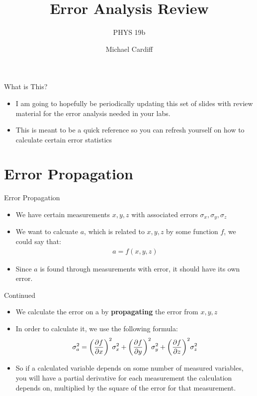 \documentclass{beamer}
\title{Error Analysis Review}
\author{Michael Cardiff}
\subtitle{PHYS 19b}
\begin{document}
\begin{frame}
  \titlepage
\end{frame}

\begin{frame}{What is This?}
  \begin{itemize}
  \item I am going to hopefully be periodically updating this set of slides with review material for the error analysis needed in your labs.
  \item This is meant to be a quick reference so you can refresh yourself on how to calculate certain error statistics
  \end{itemize}
\end{frame}

\section{Error Propagation}
\begin{frame}{Error Propagation}
  \begin{itemize}
  \item We have certain measurements $x,y,z$ with associated errors $\sigma_x,\sigma_y,\sigma_z$
  \item We want to calcuate $a$, which is related to $x,y,z$ by some function $f$, we could say that:
    \begin{align*}
      a = f(x,y,z)
    \end{align*}
  \item Since $a$ is found through measurements with error, it should have its own error.
  \end{itemize}
\end{frame}

\begin{frame}{Continued}
  \begin{itemize}
  \item We calculate the error on a by \textbf{propagating} the error from $x,y,z$
  \item In order to calculate it, we use the following formula:
    \begin{align*}
      \sigma_a^2=\qty(\pdv{f}{x})^2\sigma_x^2
      +\qty(\pdv{f}{y})^2\sigma_y^2
      +\qty(\pdv{f}{z})^2\sigma_z^2
    \end{align*}
  \item So if a calculated variable depends on some number of measured variables, you will have a partial derivative for each measurement the calculation depends on, multiplied by the square of the error for that measurement.
  \end{itemize}
\end{frame}
\end{document}
